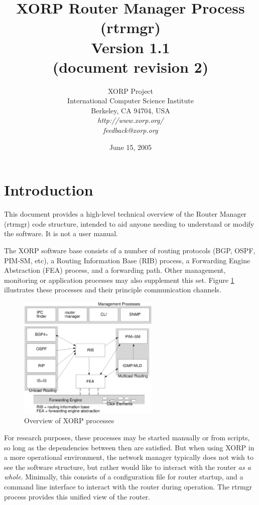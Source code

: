 \documentclass[11pt]{article}
\title{XORP Router Manager Process (rtrmgr) \\
\vspace{1ex}
Version 1.1 \\{\small(document revision 2)}}
\author{ XORP Project					\\
	 International Computer Science Institute	\\
	 Berkeley, CA 94704, USA			\\
         {\it http://www.xorp.org/}			\\
	 {\it feedback@xorp.org}
}
\date{June 15, 2005}
\begin{document}
\maketitle

\section{Introduction}

This document provides a high-level technical overview of the Router
Manager (rtrmgr) code structure, intended to aid anyone needing to
understand or modify the software.   It is not a user manual.

The XORP software base consists of a number of routing protocols (BGP,
OSPF, PIM-SM, etc), a Routing Information Base (RIB) process, a
Forwarding Engine Abstraction (FEA) process, and a forwarding path.
Other management, monitoring or application processes may also
supplement this set.  Figure \ref{overview} illustrates these
processes and their principle communication channels.

\begin{figure}[htb]
\centerline{\includegraphics[width=0.6\textwidth]{figs/processes3}}
\vspace{.05in}
\caption{\label{overview}Overview of XORP processes}
\end{figure}

For research purposes, these processes may be started manually or from
scripts, so long as the dependencies between then are satisfied.  But
when using XORP in a more operational environment, the network manager
typically does not wish to see the software structure, but rather
would like to interact with the router {\it as a whole}.  Minimally, this
consists of a configuration file for router startup, and a command
line interface to interact with the router during operation.  The
rtrmgr process provides this unified view of the router.
\end{document}
